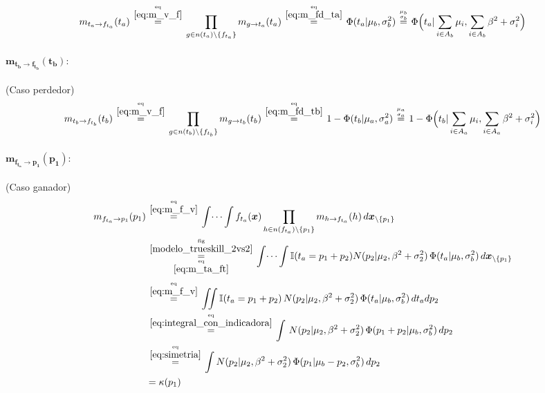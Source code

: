 \documentclass[article]{jss}
\newcommand\hfrac[2]{\genfrac{}{}{0pt}{}{#1}{#2}} %
\begin{document}
\begin{appendix}
\begin{equation}\label{eq:m_ta_ft}
\begin{split}
 m_{t_a \rightarrow f_{t_a}}(t_a) \overset{\hfrac{\text{eq}}{\ref{eq:m_v_f}}}{=} \prod_{g \in n(t_a) \setminus  \{f_{t_a} \}} m_{g \rightarrow t_a} (t_a)  \overset{\hfrac{\text{eq}}{\ref{eq:m_fd_ta}}}{=} \Phi(t_a|\mu_b,\sigma_b^2) \overset{\hfrac{\mu_b}{\sigma_b}}{=} \Phi \Big(t_a| \sum_{i \in A_b} \mu_i , \sum_{i \in A_b} \beta^2 + \sigma_i^2 \Big)
\end{split}
\end{equation}

\paragraph{$\bm{m_{t_b \rightarrow f_{t_b}}(t_b)}:$} (Caso perdedor)
\begin{equation}\label{eq:m_tb_ft}
\begin{split}
 m_{t_b \rightarrow f_{t_b}}(t_b) \overset{\hfrac{\text{eq}}{\ref{eq:m_v_f}}}{=} \prod_{g \in n(t_b) \setminus  \{f_{t_b} \}} m_{g \rightarrow t_b} (t_b)  \overset{\hfrac{\text{eq}}{\ref{eq:m_fd_tb}}}{=} 1- \Phi(t_b|\mu_a,\sigma_a^2) \overset{\hfrac{\mu_a}{\sigma_a}}{=} 1 - \Phi \Big(t_b| \sum_{i \in A_a} \mu_i , \sum_{i \in A_a} \beta^2 + \sigma_i^2 \Big)
\end{split}
\end{equation}



\paragraph{$\bm{m_{f_{t_a} \rightarrow p_1}(p_1)}:$} (Caso ganador)
\begin{equation}\label{eq:m_fta_p_inicial}
\begin{split}
m_{f_{t_a} \rightarrow p_1}(p_1)  &\overset{\hfrac{\text{eq}}{\ref{eq:m_f_v}}}{=} \int \dots \int f_{t_a}(\bm{x}) \prod_{h \in n(f_{t_a}) \setminus \{p_1\} } m_{h \rightarrow f_{t_a}}(h) \, d\bm{x}_{\setminus \{p_1\} }  \\
&\overset{\hfrac{\text{fig}}{\ref{modelo_trueskill_2vs2}}}{\underset{\hfrac{\text{eq}}{\ref{eq:m_ta_ft}}}{=}} \int \dots \int \mathbb{I}( t_a = p_1 + p_2) N(p_2| \mu_2, \beta^2 + \sigma_2^2 ) \, \Phi (t_a| \mu_b , \sigma_b^2 ) \, d\bm{x}_{\setminus \{p_1\} }\\[0.1cm]
&\overset{\hfrac{\text{eq}}{\ref{eq:m_f_v}}}{=} \iint \mathbb{I}( t_a = p_1 + p_2) \, N(p_2| \mu_2, \beta^2 + \sigma_2^2 ) \, \Phi (t_a| \mu_b , \sigma_b^2 ) \, dt_a dp_2 \\
&\overset{\hfrac{\text{eq}}{\ref{eq:integral_con_indicadora}}}{=} \int  \, N(p_2| \mu_2, \beta^2 + \sigma_2^2 ) \, \Phi (p_1 + p_2| \mu_b , \sigma_b^2 ) \, dp_2 \\
&\overset{\hfrac{\text{eq}}{\ref{eq:simetria}}}{=} \int  N(p_2| \mu_2, \beta^2 + \sigma_2^2 ) \, \Phi (p_1 | \mu_b - p_2 , \sigma_b^2) \, dp_2 \\
&= \kappa(p_1)
\end{split}
\end{equation}


\end{appendix}
\end{document}
